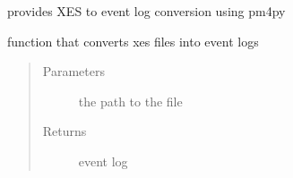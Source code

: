 \documentclass[letterpaper,10pt,english]{sphinxmanual}
\begin{document}
\begin{fulllineitems}
\label{\detokenize{eventLogConverter:eventLogConverter.concreteImplementation.XESFileConverter}}
provides XES to event log conversion using pm4py

\begin{fulllineitems}
\label{\detokenize{eventLogConverter:eventLogConverter.concreteImplementation.XESFileConverter.convert}}
function that converts xes files into event logs
\begin{quote}\begin{description}
\item[{Parameters}] \leavevmode
{} \textendash{} the path to the file

\item[{Returns}] \leavevmode
event log

\end{description}\end{quote}

\end{fulllineitems}


\end{fulllineitems}

\end{document}
